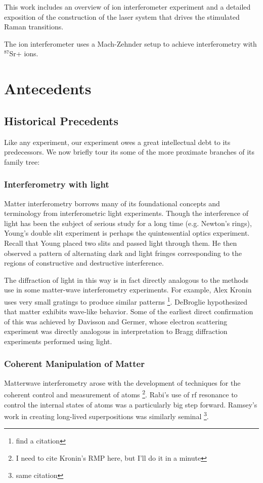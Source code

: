 

This work includes an overview of ion interferometer experiment and a detailed exposition of the construction of the laser system that drives the stimulated Raman transitions.

The ion interferometer uses a Mach-Zehnder setup to achieve interferometry with $^{87}$Sr+ ions.


\chapter{Antecedents}
\section{Historical Precedents}
Like any experiment, our experiment owes a great intellectual debt to its predecessors. We now briefly tour its some of the more proximate branches of its family tree: 
 \subsection{Interferometry with light}
Matter interferometry borrows many of its foundational concepts and terminology from interferometric light experiments. Though the interference of light has been the subject of serious study for a long time (e.g. Newton's rings), Young's double slit experiment is perhaps the quintessential optics experiment. Recall that Young placed two slits and passed light through them. He then observed a pattern of alternating dark and light fringes corresponding to the regions of constructive and destructive interference. 

The diffraction of light in this way is in fact directly analogous to the methods use in some matter-wave interferometry experiments. For example, Alex Kronin uses very small gratings to produce similar patterns \footnote{find a citation}. 
DeBroglie hypothesized that matter exhibits wave-like behavior. Some of the earliest direct confirmation of this was achieved by Davisson and Germer, whose electron scattering experiment was directly analogous in interpretation to Bragg diffraction experiments performed using light. 
\subsection{Coherent Manipulation of Matter}
Matterwave interferometry arose with the development of techniques for the coherent control and measurement of atoms \footnote{I need to cite Kronin's RMP here, but I'll do it in a minute}. Rabi's use of rf resonance to control the internal states of atoms was a particularly big step forward. Ramsey's work in creating long-lived superpositions was similarly seminal \footnote{same citation}. 

